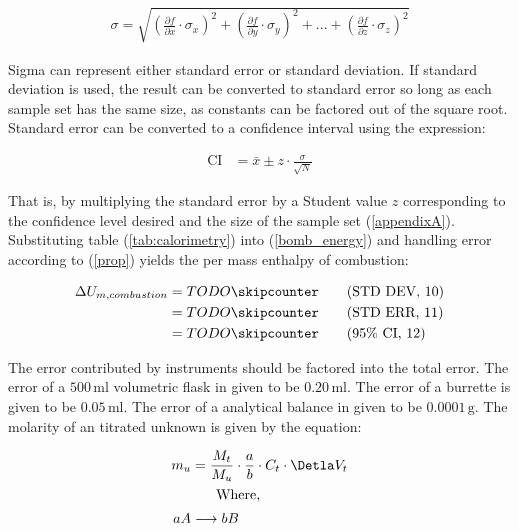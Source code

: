 \begin{align}
    \sigma = \sqrt{ \left( \frac{\partial f}{\partial x} \cdot \sigma_x \right)^2 +
                    \left( \frac{\partial f}{\partial y} \cdot \sigma_y \right)^2 +
                    \dots +
                    \left( \frac{\partial f}{\partial z} \cdot \sigma_z \right)^2 }
    \label{prop}
\end{align}

Sigma can represent either standard error or standard deviation.  If standard deviation is used, the result can be converted to standard error so long as each sample set has the same size, as constants can be factored out of the square root. \\
Standard error can be converted to a confidence interval using the expression:

\begin{align}
    \text{CI} & = \bar{x} \pm z \cdot \frac{\sigma}{\sqrt{N}}
    \label{ci}
\end{align}

That is, by multiplying the standard error by a Student value $z$ corresponding to the  confidence level desired and the size of the sample set (\ref{appendixA}). \\
Substituting table (\ref{tab:calorimetry}) into (\ref{bomb_energy}) and handling error according to (\ref{prop}) yields the per mass enthalpy of combustion:

\begin{align}
    \Delta U_{m, combustion} & = TODO \skipcounter \tag{STD DEV, 10} \\
    & = TODO \skipcounter \tag{STD ERR, 11} \\
    & = TODO \skipcounter \tag{95\% CI, 12}
\end{align}


The error contributed by instruments should be factored into the total error.  The error of a $500 \, \si{\ml}$ volumetric flask in given to be $0.20 \, \si{\ml}$.  The error of a burrette is given to be $0.05 \, \si{\ml}$.  The error of a analytical balance in given to be $0.0001 \, \si{\gram}$.  The molarity of an titrated unknown is given by the equation:

\begin{align}
    m_u & = \frac{M_t}{M_u} \cdot \frac{a}{b} \cdot C_t \cdot \Detla V_t \\
    \intertext{\hspace{1cm} Where,}
    aA & \longrightarrow bB
\end{align}

